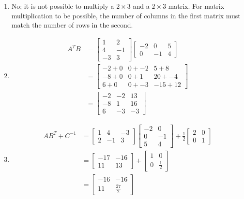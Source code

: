 \documentclass[a4paper]{article}
\begin{document}
\begin{enumerate}[label=(\alph*)]
    \item No; it is not possible to multiply a $2 \times 3$ and a $2 \times 3$ matrix. For matrix multiplication to be possible, the number of columns in the first matrix must match the number of rows in the second.
    \item
        \begin{align*}
            A^TB &= \begin{bmatrix}1&2\\4&-1\\-3&3\end{bmatrix}
            \begin{bmatrix}-2&0&5\\0&-1&4\end{bmatrix} \\
            &= \begin{bmatrix}-2+0&0+-2&5+8\\-8+0&0+1&20+-4\\6+0&0+-3&-15+12\end{bmatrix} \\
            &= \begin{bmatrix}-2&-2&13\\-8&1&16\\6&-3&-3\end{bmatrix}
        \end{align*}
    \item 
        \begin{align*}
            AB^T + C^{-1} &=
            \begin{bmatrix}1&4&-3\\2&-1&3\end{bmatrix}
            \begin{bmatrix}-2&0\\0&-1\\5&4\end{bmatrix}
            + \frac{1}{2}\begin{bmatrix}2&0\\0&1\end{bmatrix} \\
            &= \begin{bmatrix}-17&-16\\11&13\end{bmatrix}
            + \begin{bmatrix}1&0\\0&\frac12\end{bmatrix} \\
            &= \begin{bmatrix}-16&-16\\11&\frac{27}2\end{bmatrix}
        \end{align*}
        

\end{enumerate}
\end{document}
